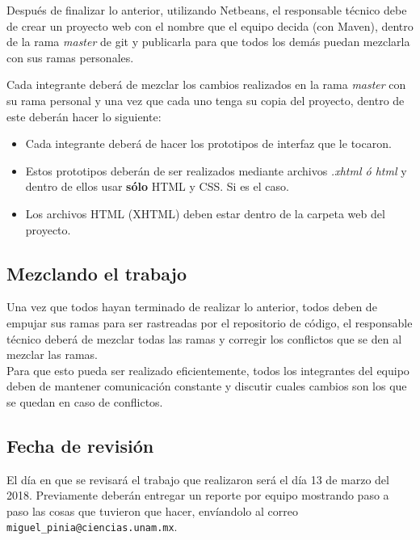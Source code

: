 \documentclass[11pt]{article}
\begin{document}
Después de finalizar lo anterior, utilizando Netbeans, el responsable
técnico debe de crear un proyecto web con el nombre que el equipo
decida (con Maven), dentro de la rama \textit{master} de git y
publicarla para que todos los demás puedan mezclarla con sus ramas
personales.

Cada integrante deberá de mezclar los cambios realizados en la rama
\textit{master} con su rama personal y una vez que cada uno tenga su
copia del proyecto, dentro de este deberán hacer lo siguiente:

\begin{itemize}
  \item Cada integrante deberá de hacer los prototipos de interfaz que
    le tocaron.
  \item Estos prototipos deberán de ser realizados mediante archivos
    \textit{.xhtml ó html} y dentro de ellos usar \textbf{sólo} HTML y CSS. Si
    es el caso.
  \item Los archivos HTML (XHTML) deben estar dentro de la carpeta web del
    proyecto.
\end{itemize}

\subsection*{Mezclando el trabajo}

Una vez que todos hayan terminado de realizar lo anterior, todos deben
de empujar sus ramas para ser rastreadas por el repositorio de código,
el responsable técnico deberá de mezclar todas las ramas y corregir
los conflictos que se den al mezclar las ramas.\\
Para que esto pueda ser realizado eficientemente, todos los
integrantes del equipo deben de mantener comunicación constante y
discutir cuales cambios son los que se quedan en caso de conflictos.

\subsection*{Fecha de revisión}
El día en que se revisará el trabajo que realizaron será el día 13 de
marzo del 2018. Previamente deberán entregar un reporte por equipo
mostrando paso a paso las cosas que tuvieron que hacer, envíandolo al
correo \texttt{miguel\_pinia@ciencias.unam.mx}.
\end{document}

